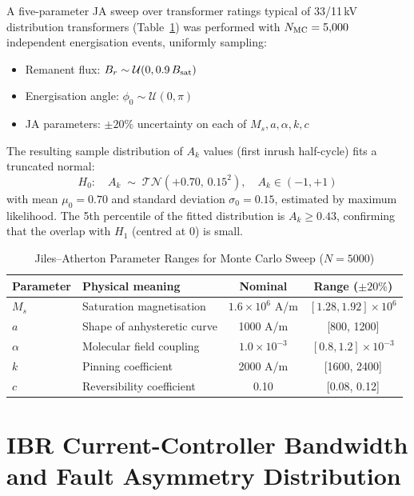 \documentclass[11pt, a4paper]{article}
\newcommand{\Ak}{A_k}
\newcommand{\TN}[2]{\mathcal{TN}(#1,\,#2)}
\begin{document}
A five-parameter JA sweep over transformer ratings typical of 33/11\,kV
distribution transformers (Table~\ref{tab:JA_params}) was performed with
$N_{\rm MC} = 5{,}000$ independent energisation events, uniformly sampling:
\begin{itemize}
  \item Remanent flux: $B_r \sim \mathcal{U}(0, 0.9\,B_{\rm sat})$
  \item Energisation angle: $\phi_0 \sim \mathcal{U}(0, \pi)$
  \item JA parameters: $\pm 20\%$ uncertainty on each of $M_s, a, \alpha, k, c$
\end{itemize}

The resulting sample distribution of $\Ak$ values (first inrush half-cycle)
fits a truncated normal:
\begin{equation}
  \boxed{H_0:\quad \Ak \;\sim\; \TN{+0.70}{0.15^2},\quad \Ak \in (-1,+1)}
  \label{eq:H0_dist}
\end{equation}
with mean $\mu_0 = 0.70$ and standard deviation $\sigma_0 = 0.15$, estimated
by maximum likelihood.  The 5th percentile of the fitted distribution is
$\Ak \geq 0.43$, confirming that the overlap with $H_1$ (centred at 0) is small.

\begin{table}[!t]
\centering
\caption{Jiles--Atherton Parameter Ranges for Monte Carlo Sweep ($N=5000$)}
\label{tab:JA_params}
\renewcommand{\arraystretch}{1.10}
\begin{tabular}{llcc}
\toprule
Parameter & Physical meaning & Nominal & Range ($\pm20\%$) \\
\midrule
$M_s$ & Saturation magnetisation & $1.6\times10^6$ A/m & $[1.28, 1.92]\times10^6$ \\
$a$   & Shape of anhysteretic curve & 1000 A/m & [800, 1200] \\
$\alpha$ & Molecular field coupling & $1.0\times10^{-3}$ & $[0.8, 1.2]\times10^{-3}$ \\
$k$   & Pinning coefficient & 2000 A/m & [1600, 2400] \\
$c$   & Reversibility coefficient & 0.10 & [0.08, 0.12] \\
\bottomrule
\end{tabular}
\end{table}

\section{IBR Current-Controller Bandwidth and Fault Asymmetry Distribution}
\label{sec:ibr_current}
\end{document}
